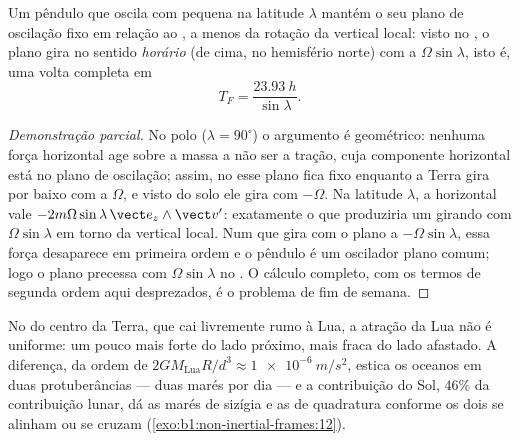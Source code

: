 \begin{proposition}\label{prop:b1:non-inertial-frames:foucault}
Um pêndulo que oscila com pequena  na latitude $\lambda$ mantém o
seu plano de oscilação fixo em relação ao , a menos
da rotação da vertical local: visto no , o plano gira
no sentido \emph{horário} (de cima, no hemisfério norte) com a  $\Omega\sin\lambda$, isto é, uma volta completa em
\[
T_F = \frac{\qty{23.93}{h}}{\sin\lambda} .
\]
\end{proposition}

\begin{proof}[Demonstração parcial]
No polo ($\lambda = 90^\circ$) o argumento é geométrico: nenhuma força
horizontal age sobre a massa a não ser a tração, cuja componente horizontal
está no plano de oscilação; assim, no  esse plano
fica fixo enquanto a Terra gira por baixo com a  $\Omega$,
e visto do solo ele gira com $-\Omega$. Na latitude $\lambda$, a  horizontal vale
$-2m\Omega\sin\lambda\,\vect e_z\wedge\vect v'$: exatamente o que produziria um
 girando com $\Omega\sin\lambda$ em torno da vertical local. Num
 que gira com o plano a $-\Omega\sin\lambda$, essa força
desaparece em primeira ordem e o pêndulo é um oscilador plano comum; logo o
plano precessa com $\Omega\sin\lambda$ no . O cálculo
completo, com os termos de segunda ordem aqui desprezados, é o problema de
fim de semana.
\end{proof}

\begin{remark}\label{rem:b1:non-inertial-frames:tides}
No  do centro da Terra, que cai livremente rumo à Lua, a atração
da Lua não é uniforme: um pouco mais forte do lado próximo, mais fraca do
lado afastado. A diferença, da ordem de $2GM_{\text{Lua}}R/d^3
\approx \qty{1e-6}{m/s^2}$, estica os oceanos em duas protuberâncias --- duas
marés por dia --- e a contribuição do Sol, $46\%$ da contribuição lunar, dá
as marés de sizígia e as de quadratura conforme os dois se alinham ou se cruzam
(\cref{exo:b1:non-inertial-frames:12}).
\end{remark}


